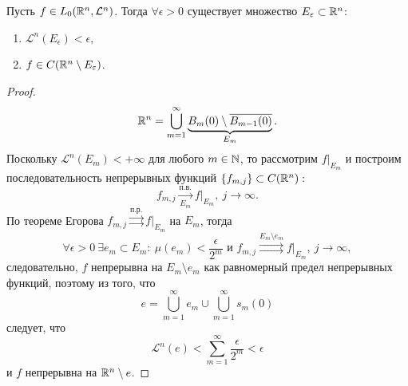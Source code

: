 \begin{theorem}[Лузин]
    Пусть $f \in L_0(\mathbb{R}^n, \mathcal{L}^n)$.
    Тогда $\forall \epsilon > 0$ существует множество $E_\varepsilon \subset \mathbb{R}^n$:
    \begin{enumerate}
        \item $\mathcal{L}^n(E_\epsilon) < \epsilon,$
        \item $f \in C(\mathbb{R}^n \setminus E_\varepsilon)$.
    \end{enumerate}
\end{theorem} 
\begin{proof}
    $$\mathbb{R}^n = \bigcup\limits_{m=1}^{\infty} \underbrace{B_m(0) \setminus \overline{B_{m-1}(0)}}_{E_m}.$$
    Поскольку $\mathcal{L}^n (E_m) < +\infty$ для любого $m \in \mathbb{N}$, то рассмотрим $f|_{E_m}$ и построим последовательность непрерывных функций $\{f_{m,j}\} \subset C(\mathbb{R}^n):$
    \[f_{m,j} \xrightarrow[E_m]{\text{п.в.}} f|_{E_m}, \ j \to \infty.\]
    По теореме Егорова $f_{m,j} \overset{\text{п.р.}}{\rightrightarrows} f|_{E_m}$ на $E_m$, тогда
    \[\forall \epsilon > 0 \ \exists e_m \subset E_m: \
    \mu(e_m) < \frac{\epsilon}{2^m} \text{ и } f_{m,j} \overset{E_m \setminus e_m}{\rightrightarrows} f|_{E_m}, \ j \to \infty,\]
    следовательно, $f$ непрерывна на $E_m \setminus e_m$ как равномерный предел непрерывных функций, поэтому из того, что
    $$e = \bigcup\limits_{m=1}^{\infty} e_m \cup \bigcup\limits_{m=1}^{\infty} s_m(0)$$
    следует, что
    \[\mathcal{L}^n(e) < \sum\limits_{m=1}^{\infty} \frac{\epsilon}{2^m} < \epsilon\]
    и $f$ непрерывна на $\mathbb{R}^n \setminus e$.
\end{proof} 